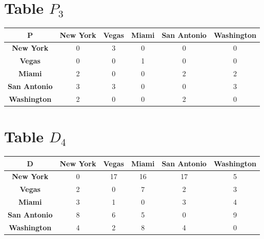 \documentclass{article}
\begin{document}
\section{Table $P_{3}$}
\begin{center}
    \begin{tabular}{|c||c|c|c|c|c|}
        \hline
        \textbf{P} & \textbf{New York} & \textbf{Vegas} & \textbf{Miami} & \textbf{San Antonio} & \textbf{Washington} \\
        \hline
        \hline
        \textbf{New York}& 0 & \cellcolor[HTML]{D74894}$3$ & 0 & 0 & 0 \\
        \hline
        \textbf{Vegas}& 0 & 0 & 1 & 0 & 0 \\
        \hline
        \textbf{Miami}& 2 & 0 & 0 & 2 & 2 \\
        \hline
        \textbf{San Antonio}& \cellcolor[HTML]{D74894}$3$ & \cellcolor[HTML]{D74894}$3$ & 0 & 0 & \cellcolor[HTML]{D74894}$3$ \\
        \hline
        \textbf{Washington}& 2 & 0 & 0 & 2 & 0 \\
        \hline
    \end{tabular}
\end{center}


\section{Table $D_{4}$}
\begin{center}
    \begin{tabular}{|c||c|c|c|c|c|}
        \hline
        \textbf{D} & \textbf{New York} & \textbf{Vegas} & \textbf{Miami} & \textbf{San Antonio} & \textbf{Washington} \\
        \hline
        \hline
        \textbf{New York}& 0 & 17 & 16 & 17 & 5 \\
        \hline
        \textbf{Vegas}& 2 & 0 & \cellcolor[HTML]{D74894}$7$ & 2 & 3 \\
        \hline
        \textbf{Miami}& 3 & 1 & 0 & 3 & 4 \\
        \hline
        \textbf{San Antonio}& 8 & 6 & 5 & 0 & 9 \\
        \hline
        \textbf{Washington}& 4 & 2 & 8 & 4 & 0 \\
        \hline
    \end{tabular}
\end{center}
\end{document}
